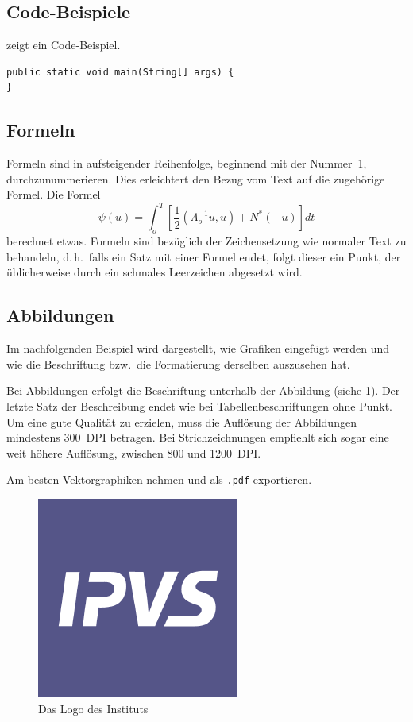 \documentclass[runningheads,a4paper]{llncs}[2022/01/12]
\begin{document}
\subsection{Code-Beispiele}

 zeigt ein Code-Beispiel.

\begin{lstlisting}[float,caption=A floating example,label=lst:example]
public static void main(String[] args) {
}
\end{lstlisting}

\subsection{Formeln}
Formeln sind in aufsteigender Reihenfolge, beginnend mit der Nummer~1, durchzunummerieren.
Dies erleichtert den Bezug vom Text auf die zugehörige Formel.
Die Formel
%
\begin{equation}
  \psi (u) = \int_{o}^{T} \left[\frac{1}{2}
  \left(\Lambda_{o}^{-1} u,u\right) + N^{\ast} (-u)\right] dt
\end{equation}
%
berechnet etwas.
Formeln sind bezüglich der Zeichensetzung wie normaler Text zu behandeln, d.\,h.\ falls ein Satz mit einer Formel endet, folgt dieser ein Punkt, der üblicherweise durch ein schmales Leerzeichen abgesetzt wird.

\subsection{Abbildungen}
Im nachfolgenden Beispiel wird dargestellt, wie Grafiken eingefügt werden und wie die Beschriftung bzw.\ die Formatierung derselben auszusehen hat.

Bei Abbildungen erfolgt die Beschriftung unterhalb der Abbildung (siehe \cref{fig:logo}).
Der letzte Satz der Beschreibung endet wie bei Tabellenbeschriftungen ohne Punkt.
Um eine gute Qualität zu erzielen, muss die Auflösung der Abbildungen mindestens 300~DPI betragen.
Bei Strichzeichnungen empfiehlt sich sogar eine weit höhere Auflösung, zwischen 800 und
1200~DPI.

Am besten Vektorgraphiken nehmen und als \texttt{.pdf} exportieren.

\begin{figure}
  \begin{center}
    \includegraphics[width=.5\textwidth]{ipvs_logo.png}
    \caption{Das Logo des Instituts}
    \label{fig:logo}
   \end{center}
\end{figure}
\end{document}
